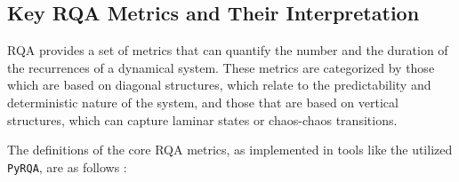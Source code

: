 \documentclass{article}
\begin{document}
				\subsection{Key RQA Metrics and Their Interpretation}
					\label{subsec:rqa_metrics}

					RQA provides a set of metrics that can quantify the 
					number and the duration of the recurrences of a dynamical system.
					These metrics are categorized by those which are based on diagonal structures, 
					which relate to the predictability and deterministic nature of the system, 
					and those that are based on vertical structures, which can capture laminar 
					states or chaos-chaos transitions.

					The definitions of the core RQA metrics, as implemented in tools like the utilized \texttt{PyRQA}, 
					are as follows \cite{marwan_website}:
\end{document}

